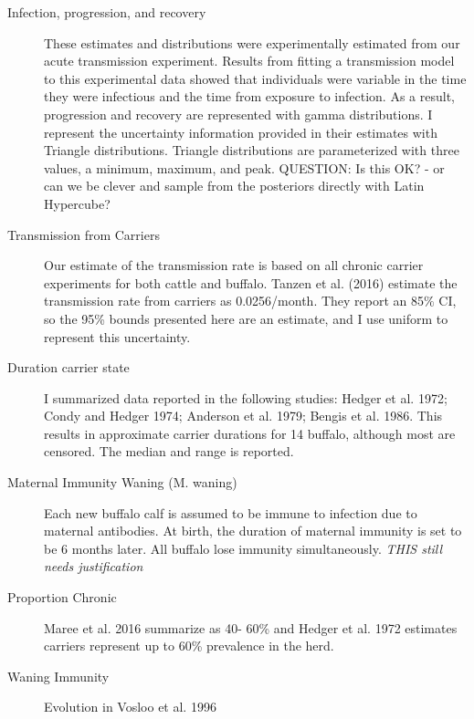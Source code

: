 \documentclass{article}
\begin{document}
\begin{description}
\item[Infection, progression, and recovery]
These estimates and distributions were experimentally estimated from our acute transmission experiment. 
Results from fitting a transmission model to this experimental data showed that individuals were variable in the time they were infectious and the time from exposure to infection.  As a result, progression and recovery are represented with gamma distributions. 
I represent the uncertainty information provided in their estimates with Triangle distributions. Triangle distributions are parameterized with three values, a minimum, maximum, and peak.
QUESTION: Is this OK? - or can we be clever and sample from the posteriors directly with Latin Hypercube?  

\item[Transmission from Carriers]
Our estimate of the transmission rate is based on all chronic carrier experiments for both cattle and buffalo.
Tanzen et al. (2016) estimate the transmission rate from carriers as 0.0256/month.
They report an 85$\%$ CI, so the 95\% bounds presented here are an estimate, and I use uniform to represent this uncertainty.

\item[Duration carrier state]
I summarized data reported in the following studies: Hedger et al. 1972; Condy and Hedger 1974; Anderson et al. 1979; Bengis et al. 1986.
This results in approximate carrier durations for 14 buffalo, although most are censored.  The median and range is reported.

\item[Maternal Immunity Waning (M. waning)] 
Each new buffalo calf is assumed to be immune to infection due to maternal antibodies. 
At birth, the duration of maternal immunity is set to be 6 months later.  All buffalo lose immunity simultaneously.  \textit{THIS still needs justification}

\item[Proportion Chronic] 
 Maree et al. 2016 summarize as 40- 60\% and Hedger et al. 1972 estimates carriers represent up to 60\% prevalence in the herd.

\item[Waning Immunity] 
Evolution in Vosloo et al. 1996

\end{description}
\end{document}
